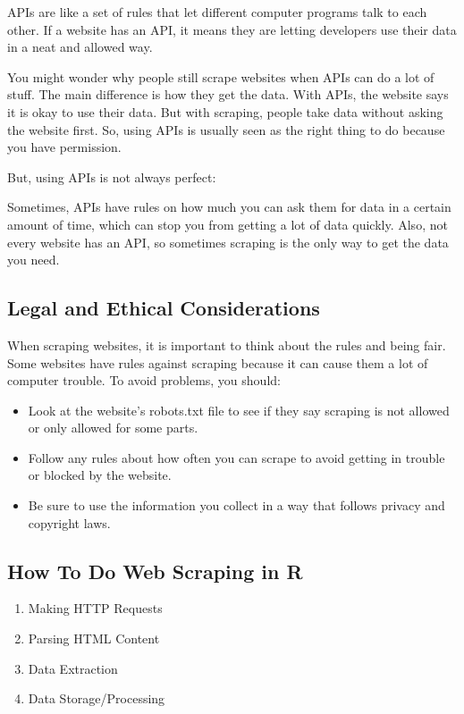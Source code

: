 \documentclass[
]{article}
\providecommand{\tightlist}{%
  \setlength{\itemsep}{0pt}\setlength{\parskip}{0pt}}
\begin{document}
APIs are like a set of rules that let different computer programs talk
to each other. If a website has an API, it means they are letting
developers use their data in a neat and allowed way.

You might wonder why people still scrape websites when APIs can do a lot
of stuff. The main difference is how they get the data. With APIs, the
website says it is okay to use their data. But with scraping, people
take data without asking the website first. So, using APIs is usually
seen as the right thing to do because you have permission.

But, using APIs is not always perfect:

Sometimes, APIs have rules on how much you can ask them for data in a
certain amount of time, which can stop you from getting a lot of data
quickly. Also, not every website has an API, so sometimes scraping is
the only way to get the data you need.

\hypertarget{legal-and-ethical-considerations}{%
\subsection{Legal and Ethical
Considerations}\label{legal-and-ethical-considerations}}

When scraping websites, it is important to think about the rules and
being fair. Some websites have rules against scraping because it can
cause them a lot of computer trouble. To avoid problems, you should:

\begin{itemize}
\tightlist
\item
  Look at the website's robots.txt file to see if they say scraping is
  not allowed or only allowed for some parts.
\item
  Follow any rules about how often you can scrape to avoid getting in
  trouble or blocked by the website.
\item
  Be sure to use the information you collect in a way that follows
  privacy and copyright laws.
\end{itemize}

\hypertarget{how-to-do-web-scraping-in-r}{%
\subsection{How To Do Web Scraping in
R}\label{how-to-do-web-scraping-in-r}}

\begin{enumerate}
\def\labelenumi{\arabic{enumi}.}
\tightlist
\item
  Making HTTP Requests
\item
  Parsing HTML Content
\item
  Data Extraction
\item
  Data Storage/Processing
\end{enumerate}
\end{document}

